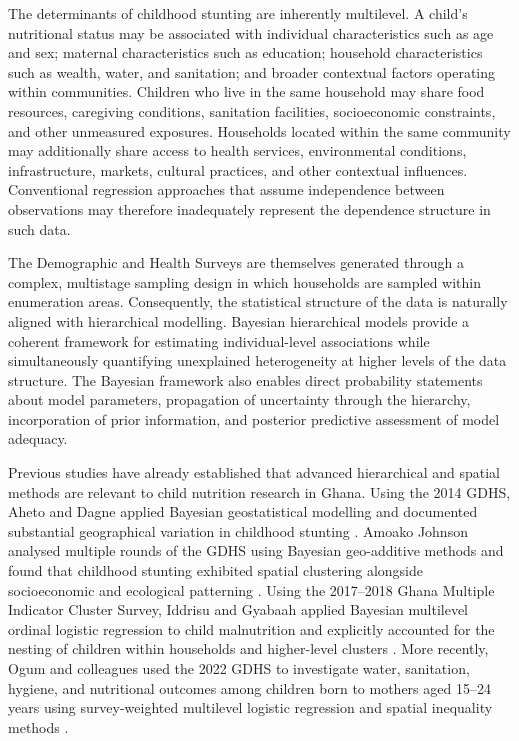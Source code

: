 The determinants of childhood stunting are inherently multilevel. A child's nutritional status may be associated with individual characteristics such as age and sex; maternal characteristics such as education; household characteristics such as wealth, water, and sanitation; and broader contextual factors operating within communities. Children who live in the same household may share food resources, caregiving conditions, sanitation facilities, socioeconomic constraints, and other unmeasured exposures. Households located within the same community may additionally share access to health services, environmental conditions, infrastructure, markets, cultural practices, and other contextual influences. Conventional regression approaches that assume independence between observations may therefore inadequately represent the dependence structure in such data.

The Demographic and Health Surveys are themselves generated through a complex, multistage sampling design in which households are sampled within enumeration areas. Consequently, the statistical structure of the data is naturally aligned with hierarchical modelling. Bayesian hierarchical models provide a coherent framework for estimating individual-level associations while simultaneously quantifying unexplained heterogeneity at higher levels of the data structure. The Bayesian framework also enables direct probability statements about model parameters, propagation of uncertainty through the hierarchy, incorporation of prior information, and posterior predictive assessment of model adequacy.

Previous studies have already established that advanced hierarchical and spatial methods are relevant to child nutrition research in Ghana. Using the 2014 GDHS, Aheto and Dagne applied Bayesian geostatistical modelling and documented substantial geographical variation in childhood stunting \cite{AhetoDagne2021}. Amoako Johnson analysed multiple rounds of the GDHS using Bayesian geo-additive methods and found that childhood stunting exhibited spatial clustering alongside socioeconomic and ecological patterning \cite{AmoakoJohnson2022}. Using the 2017--2018 Ghana Multiple Indicator Cluster Survey, Iddrisu and Gyabaah applied Bayesian multilevel ordinal logistic regression to child malnutrition and explicitly accounted for the nesting of children within households and higher-level clusters \cite{IddrisuGyabaah2023}. More recently, Ogum and colleagues used the 2022 GDHS to investigate water, sanitation, hygiene, and nutritional outcomes among children born to mothers aged 15--24 years using survey-weighted multilevel logistic regression and spatial inequality methods \cite{OgumEtAl2026}.

